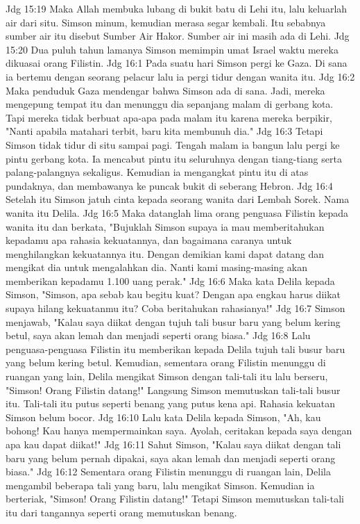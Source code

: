 Jdg 15:19  Maka Allah membuka lubang di bukit batu di Lehi itu, lalu keluarlah air dari situ. Simson minum, kemudian merasa segar kembali. Itu sebabnya sumber air itu disebut Sumber Air Hakor. Sumber air ini masih ada di Lehi.
Jdg 15:20  Dua puluh tahun lamanya Simson memimpin umat Israel waktu mereka dikuasai orang Filistin.
Jdg 16:1  Pada suatu hari Simson pergi ke Gaza. Di sana ia bertemu dengan seorang pelacur lalu ia pergi tidur dengan wanita itu.
Jdg 16:2  Maka penduduk Gaza mendengar bahwa Simson ada di sana. Jadi, mereka mengepung tempat itu dan menunggu dia sepanjang malam di gerbang kota. Tapi mereka tidak berbuat apa-apa pada malam itu karena mereka berpikir, "Nanti apabila matahari terbit, baru kita membunuh dia."
Jdg 16:3  Tetapi Simson tidak tidur di situ sampai pagi. Tengah malam ia bangun lalu pergi ke pintu gerbang kota. Ia mencabut pintu itu seluruhnya dengan tiang-tiang serta palang-palangnya sekaligus. Kemudian ia mengangkat pintu itu di atas pundaknya, dan membawanya ke puncak bukit di seberang Hebron.
Jdg 16:4  Setelah itu Simson jatuh cinta kepada seorang wanita dari Lembah Sorek. Nama wanita itu Delila.
Jdg 16:5  Maka datanglah lima orang penguasa Filistin kepada wanita itu dan berkata, "Bujuklah Simson supaya ia mau memberitahukan kepadamu apa rahasia kekuatannya, dan bagaimana caranya untuk menghilangkan kekuatannya itu. Dengan demikian kami dapat datang dan mengikat dia untuk mengalahkan dia. Nanti kami masing-masing akan memberikan kepadamu 1.100 uang perak."
Jdg 16:6  Maka kata Delila kepada Simson, "Simson, apa sebab kau begitu kuat? Dengan apa engkau harus diikat supaya hilang kekuatanmu itu? Coba beritahukan rahasianya!"
Jdg 16:7  Simson menjawab, "Kalau saya diikat dengan tujuh tali busur baru yang belum kering betul, saya akan lemah dan menjadi seperti orang biasa."
Jdg 16:8  Lalu penguasa-penguasa Filistin itu memberikan kepada Delila tujuh tali busur baru yang belum kering betul. Kemudian, sementara orang Filistin menunggu di ruangan yang lain, Delila mengikat Simson dengan tali-tali itu lalu berseru, "Simson! Orang Filistin datang!" Langsung Simson memutuskan tali-tali busur itu. Tali-tali itu putus seperti benang yang putus kena api. Rahasia kekuatan Simson belum bocor.
Jdg 16:10  Lalu kata Delila kepada Simson, "Ah, kau bohong! Kau hanya mempermainkan saya. Ayolah, ceritakan kepada saya dengan apa kau dapat diikat!"
Jdg 16:11  Sahut Simson, "Kalau saya diikat dengan tali baru yang belum pernah dipakai, saya akan lemah dan menjadi seperti orang biasa."
Jdg 16:12  Sementara orang Filistin menunggu di ruangan lain, Delila mengambil beberapa tali yang baru, lalu mengikat Simson. Kemudian ia berteriak, "Simson! Orang Filistin datang!" Tetapi Simson memutuskan tali-tali itu dari tangannya seperti orang memutuskan benang.
